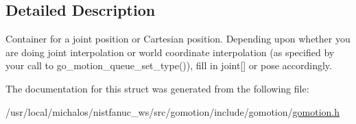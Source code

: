 \subsection{Detailed Description}
Container for a joint position or Cartesian position. Depending upon whether you are doing joint interpolation or world coordinate interpolation (as specified by your call to go\-\_\-motion\-\_\-queue\-\_\-set\-\_\-type()), fill in joint\mbox{[}\mbox{]} or pose accordingly. 

The documentation for this struct was generated from the following file\-:\begin{DoxyCompactItemize}
\item 
/usr/local/michalos/nistfanuc\-\_\-ws/src/gomotion/include/gomotion/\hyperlink{gomotion_8h}{gomotion.\-h}\end{DoxyCompactItemize}
